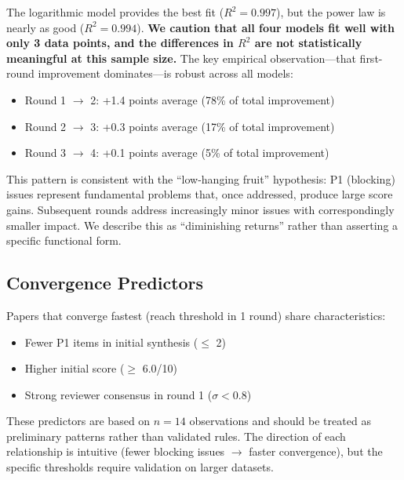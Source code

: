 \noindent The logarithmic model provides the best fit ($R^2 = 0.997$), but the power law is nearly as good ($R^2 = 0.994$). \textbf{We caution that all four models fit well with only 3 data points, and the differences in $R^2$ are not statistically meaningful at this sample size.} The key empirical observation---that first-round improvement dominates---is robust across all models:

\begin{itemize}
    \item Round 1 $\to$ 2: +1.4 points average (78\% of total improvement)
    \item Round 2 $\to$ 3: +0.3 points average (17\% of total improvement)
    \item Round 3 $\to$ 4: +0.1 points average (5\% of total improvement)
\end{itemize}

\noindent This pattern is consistent with the ``low-hanging fruit'' hypothesis: P1 (blocking) issues represent fundamental problems that, once addressed, produce large score gains. Subsequent rounds address increasingly minor issues with correspondingly smaller impact. We describe this as ``diminishing returns'' rather than asserting a specific functional form.

\subsection{Convergence Predictors}

Papers that converge fastest (reach threshold in 1 round) share characteristics:
\begin{itemize}
    \item Fewer P1 items in initial synthesis ($\leq$ 2)
    \item Higher initial score ($\geq$ 6.0/10)
    \item Strong reviewer consensus in round 1 ($\sigma < 0.8$)
\end{itemize}

\noindent These predictors are based on $n=14$ observations and should be treated as preliminary patterns rather than validated rules. The direction of each relationship is intuitive (fewer blocking issues $\to$ faster convergence), but the specific thresholds require validation on larger datasets.
